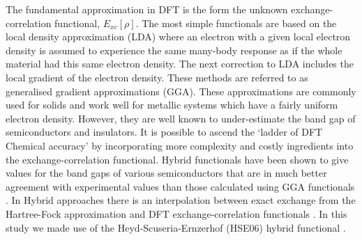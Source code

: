 The fundamental approximation in DFT is the form the unknown exchange-correlation functional, $E_{xc}[\rho]$. The most simple functionals are based on 
the local density approximation (LDA) where an electron with a given local electron density is assumed to 
experience the same many-body response as if the whole material had this same electron density. The next correction to LDA includes the local gradient of the electron density. These methods are referred to as generalised gradient approximations (GGA). These approximations are commonly used for solids and work well for metallic systems which have a fairly uniform electron density. However, they are well known to under-estimate the band gap of semiconductors and insulators. It is possible to ascend the `ladder of DFT Chemical 
accuracy' \cite{ladder} by incorporating more complexity and costly ingredients into the exchange-correlation functional.
Hybrid functionals have been shown to give values for the band gaps of various semiconductors that are in much better agreement with experimental values than those calculated using GGA functionals \cite{hybrid_GGA_CZTS}. In Hybrid approaches there is an interpolation between exact exchange from the Hartree-Fock approximation and DFT exchange-correlation functionals \cite{Lesar}. In this study we made use of the Heyd-Scuseria-Ernzerhof (HSE06) hybrid functional \cite{HSE}.